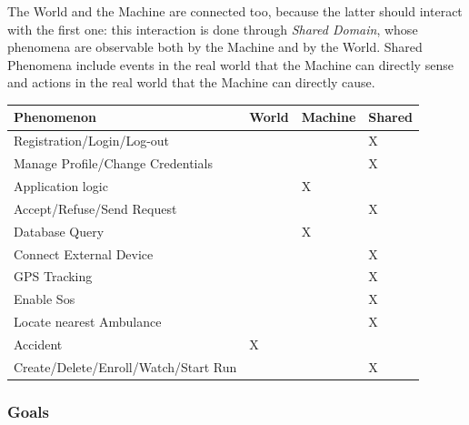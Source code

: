 \documentclass[a4paper]{article}
\begin{document}
        The World and the Machine are connected too, because the latter should interact with the first one: this interaction is done through \textit{Shared Domain}, whose phenomena are observable both by the Machine and by the World. Shared Phenomena include events in the real world that the Machine can directly sense and actions in the real world that the Machine can directly cause.
        \newpage
        \begin{table}[!htpb]
        \centering
        \begin{tabular}{|l|l|l|l|}
        \hline
         \textbf{Phenomenon} & \textbf{World} & \textbf{Machine} & \textbf{Shared}\\ \hline
         Registration/Login/Log-out & & & X \\ \hline
         Manage Profile/Change Credentials & & & X \\ \hline
         Application logic & & X & \\ \hline
         Accept/Refuse/Send Request & & & X \\ \hline
         Database Query & & X & \\ \hline
         Connect External Device & & & X \\ \hline
         GPS Tracking & & & X \\ \hline
         Enable Sos & & & X \\ \hline
         Locate nearest Ambulance & & & X \\ \hline
         Accident & X & & \\ \hline
         Create/Delete/Enroll/Watch/Start Run & & & X \\ \hline
        \end{tabular}
        \end{table}
        
        \subsubsection{Goals}
        
\end{document}
